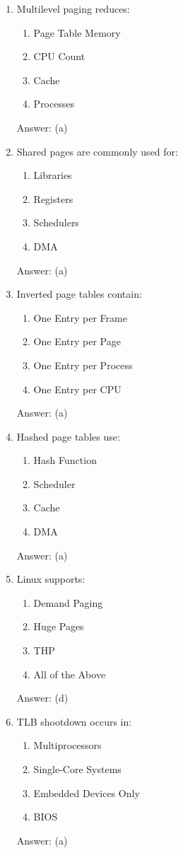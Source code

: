 \begin{enumerate}
\item Multilevel paging reduces:
\begin{enumerate}[label=(\alph*)]
\item Page Table Memory
\item CPU Count
\item Cache
\item Processes
\end{enumerate}
Answer: (a)

\item Shared pages are commonly used for:
\begin{enumerate}[label=(\alph*)]
\item Libraries
\item Registers
\item Schedulers
\item DMA
\end{enumerate}
Answer: (a)

\item Inverted page tables contain:
\begin{enumerate}[label=(\alph*)]
\item One Entry per Frame
\item One Entry per Page
\item One Entry per Process
\item One Entry per CPU
\end{enumerate}
Answer: (a)

\item Hashed page tables use:
\begin{enumerate}[label=(\alph*)]
\item Hash Function
\item Scheduler
\item Cache
\item DMA
\end{enumerate}
Answer: (a)

\item Linux supports:
\begin{enumerate}[label=(\alph*)]
\item Demand Paging
\item Huge Pages
\item THP
\item All of the Above
\end{enumerate}
Answer: (d)

\item TLB shootdown occurs in:
\begin{enumerate}[label=(\alph*)]
\item Multiprocessors
\item Single-Core Systems
\item Embedded Devices Only
\item BIOS
\end{enumerate}
Answer: (a)


\end{enumerate}
